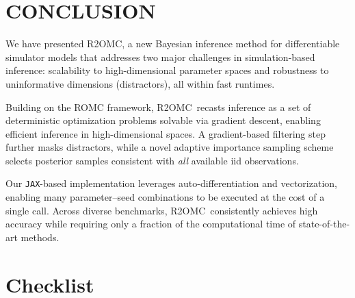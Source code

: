 \documentclass[twoside]{article}
\newlength{\secvspace}
\newcommand{\rromc}{R2OMC}
\begin{document}
\vspace{\secvspace}
\section{CONCLUSION}
\vspace{\secvspace}
\label{sec:conclusion}
We have presented \rromc, a new Bayesian inference method for differentiable simulator models that addresses two major challenges in simulation-based inference:
scalability to high-dimensional parameter spaces and robustness to uninformative dimensions (distractors), all within fast runtimes.

Building on the ROMC framework, \rromc~recasts inference as a set of deterministic optimization problems solvable via gradient descent, enabling efficient inference in high-dimensional spaces. 
A gradient-based filtering step further masks distractors, while a novel adaptive importance sampling scheme selects posterior samples consistent with \emph{all} available iid observations.

Our \texttt{JAX}-based implementation leverages auto-differentiation and vectorization, enabling many parameter–seed combinations to be executed at the cost of a single call.
Across diverse benchmarks, \rromc~consistently achieves high accuracy while requiring only a fraction of the computational time of state-of-the-art methods.








\section*{Checklist}
\end{document}
